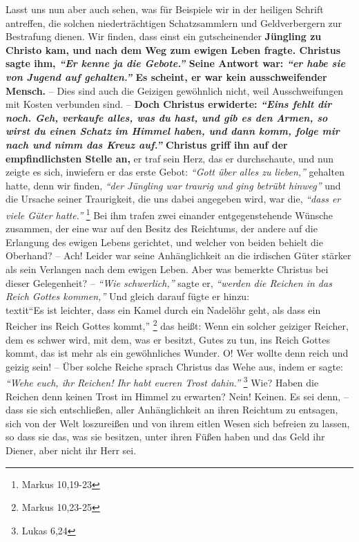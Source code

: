 Lasst uns nun aber auch sehen, was für Beispiele wir in der heiligen Schrift
antreffen, die solchen niederträchtigen
Schatzsammlern und Geldverbergern zur
Bestrafung dienen. Wir finden, dass einst ein gutscheinender
\textbf{Jüngling zu Christo
kam, und nach dem Weg zum ewigen Leben fragte. Christus sagte ihm,
\textit{"`Er kenne ja die Gebote."'} Seine Antwort war:
\textit{"`er habe sie von Jugend auf gehalten."'} Es
scheint, er war kein ausschweifender Mensch.} -- Dies sind auch die Geizigen
gewöhnlich nicht, weil Ausschweifungen mit Kosten verbunden
sind. -- \textbf{Doch
Christus erwiderte:
\textit{"`Eins fehlt dir noch. Geh, verkaufe alles, was du hast,
und gib es den Armen, so wirst du einen Schatz im Himmel haben, und dann komm, folge mir nach 
und nimm das Kreuz auf."'} Christus griff ihn auf der
empfindlichsten Stelle an,} er traf sein Herz, das er durchschaute, und nun
zeigte es sich, inwiefern er das erste Gebot: \textit{"`Gott über alles zu
lieben,"'}
gehalten hatte, denn wir finden, \textit{"`der Jüngling war traurig und ging
betrübt
hinweg"'} und die Ursache seiner Traurigkeit, die uns dabei angegeben wird, war
die,
\textit{"`dass er viele Güter hatte."'}
\footnote{Markus 10,19-23}
Bei ihm trafen zwei einander entgegenstehende Wünsche zusammen, der eine war auf den Besitz des
Reichtums, der andere auf die Erlangung des ewigen Lebens
gerichtet, und
welcher von beiden behielt die Oberhand? -- Ach! Leider war seine Anhänglichkeit
an die irdischen Güter stärker als sein Verlangen nach dem ewigen Leben. Aber
was bemerkte Christus bei dieser Gelegenheit? -- \textit{"`Wie schwerlich,"'}
sagte er,
\textit{"`werden die Reichen in das Reich Gottes kommen,"'} Und gleich darauf
fügte er
hinzu:\\textit{"`Es ist leichter, dass ein Kamel durch ein Nadelöhr geht, als
dass ein
Reicher ins Reich Gottes kommt,"'}
\footnote{Markus 10,23-25}
das heißt: Wenn ein
solcher geiziger Reicher, dem es schwer wird, mit dem, was er besitzt, Gutes zu
tun, ins Reich Gottes kommt, das ist mehr als ein
gewöhnliches Wunder. O! Wer
wollte denn reich und geizig sein! -- Über solche Reiche sprach Christus das
Wehe aus, indem er sagte: \textit{"`Wehe euch, ihr Reichen! Ihr habt eueren
Trost
dahin."'}
\footnote{Lukas 6,24}
Wie? Haben die Reichen denn keinen Trost im
Himmel zu erwarten? Nein! Keinen. Es sei denn, -- dass sie sich
entschließen,
aller Anhänglichkeit an ihren Reichtum zu entsagen, sich von der Welt
loszureißen und von ihrem eitlen Wesen sich befreien zu lassen, so dass sie das,
was sie besitzen, unter ihren Füßen haben und das Geld ihr Diener, aber nicht
ihr Herr sei.

